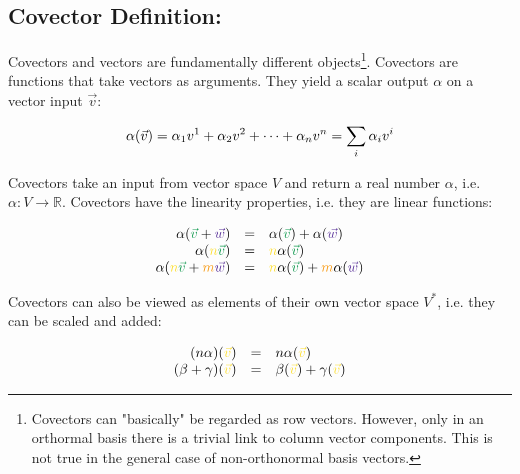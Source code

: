 \subsection{Covector Definition:}

Covectors and vectors are fundamentally different objects\footnote{Covectors can
"basically" be regarded as row vectors. However, only in an orthormal basis there is a
trivial link to column vector components. This is not true in the general case of
non-orthonormal basis vectors.}. Covectors are functions that take vectors as arguments.
They yield a scalar output $\alpha$ on a vector input $\vec{v}$:

\begin{equation}
    \alpha(\vec{v}) = \alpha_1 v^1 + \alpha_2 v^2 + \dots + \alpha_n v^n =
    \sum\limits_{i}\alpha_i v^{i} 
\end{equation}

Covectors take an input from vector space $V$ and return a real number $\alpha$, i.e.
$\alpha: V \rightarrow \mathbb{R}$. Covectors have the linearity properties, i.e. they are
linear functions:

\begin{equation}
    \label{eq:covector_linearity}
    \begin{array}{rcl}
        \alpha(\textcolor{ForestGreen}{\vec{v}}+\textcolor{RoyalPurple}{\vec{w}}) & = &
        \alpha(\textcolor{ForestGreen}{\vec{v}})+\alpha(\textcolor{RoyalPurple}{\vec{w}}) \\
        \alpha(\textcolor{Goldenrod}{n}\textcolor{ForestGreen}{\vec{v}}) & = &
        \textcolor{Goldenrod}{n}\alpha(\textcolor{ForestGreen}{\vec{v}}) \\
        \alpha(\textcolor{Goldenrod}{n}\textcolor{ForestGreen}{\vec{v}}+
        \textcolor{YellowOrange}{m}\textcolor{RoyalPurple}{\vec{w}}) & = &
        \textcolor{Goldenrod}{n}\alpha(\textcolor{ForestGreen}{\vec{v}})+
        \textcolor{YellowOrange}{m}\alpha(\textcolor{RoyalPurple}{\vec{w}})
    \end{array}
\end{equation}

Covectors can also be viewed as elements of their own vector space $V^*$, i.e. they can be
scaled and added:

\begin{equation}
    \label{eq:covector_add_scale}
    \begin{array}{rcl}
        (n\alpha)(\hdv) & = &
        n\alpha(\hdv)\\
        (\beta + \gamma)(\hdv) & = &
        \beta(\hdv)+ \gamma(\hdv)
    \end{array}
\end{equation}


